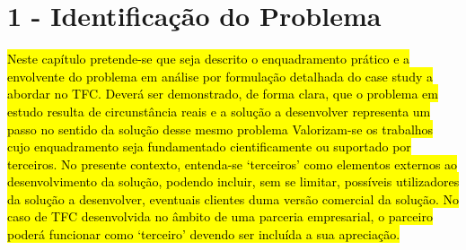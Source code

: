 \chapter*{1 - Identificação do Problema}

\hl{Neste capítulo pretende-se que seja descrito o enquadramento prático e a envolvente do problema em análise por formulação detalhada do case study a abordar no TFC. 
Deverá ser demonstrado, de forma clara, que o problema em estudo resulta de circunstância reais e a solução a desenvolver representa um passo no sentido da solução desse mesmo problema 
Valorizam-se os trabalhos cujo enquadramento seja fundamentado cientificamente ou suportado por terceiros. No presente contexto, entenda-se ‘terceiros’ como elementos externos ao desenvolvimento da solução, podendo incluir, sem se limitar, possíveis utilizadores da solução a desenvolver, eventuais clientes duma versão comercial da solução. 
No caso de TFC desenvolvida no âmbito de uma parceria empresarial, o parceiro poderá funcionar como ‘terceiro’ devendo ser incluída a sua apreciação.}